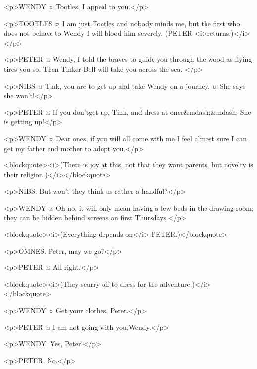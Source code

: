 <p>WENDY ¤
Tootles, I appeal to you.</p>

<p>TOOTLES ¤
I am just Tootles and nobody minds me, but the first who does not behave to Wendy I will blood him severely. (PETER <i>returns.)</i></p>

<p>PETER ¤
Wendy, I told the braves to guide you through the wood as flying tires you so. Then Tinker Bell will take you across the sea.
</p>

<p>NIBS ¤
Tink, you are to get up and take Wendy on a journey.
¤
She says she won't!</p>

<p>PETER ¤
If you don'tget up, Tink, and dress at once&mdash;&mdash; She is getting up!</p>

<p>WENDY ¤
Dear ones, if you will all come with me I feel almost sure I can get my father and mother to adopt you.</p>

<blockquote><i>(There is joy at this, not that they want parents, but novelty is their religion.)</i></blockquote>

<p>NIBS. But won't they think us rather a handful?</p>

<p>WENDY ¤
Oh no, it will only mean having a few beds in the drawing-room; they can be hidden behind screens on first Thursdays.</p>

<blockquote><i>(Everything depends on</i> PETER.)</blockquote>

<p>OMNES. Peter, may we go?</p>

<p>PETER ¤
All right.</p>

<blockquote><i>(They scurry off to dress for the adventure.)</i></blockquote>

<p>WENDY ¤
Get your clothes, Peter.</p>

<p>PETER ¤
I am not going with you,Wendy.</p>

<p>WENDY. Yes, Peter!</p>

<p>PETER. No.</p>

